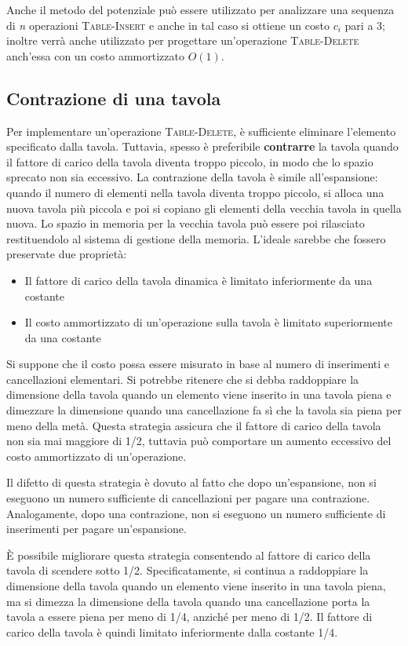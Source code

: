 \documentclass[10pt, a4paper]{report}
\begin{document}
Anche il metodo del potenziale può essere utilizzato per analizzare una sequenza di \textit{n} operazioni \textsc{Table-Insert} e anche in tal caso si ottiene un costo $c_i$ pari a 3; inoltre verrà anche utilizzato per progettare un'operazione \textsc{Table-Delete} anch'essa con un costo ammortizzato $O(1)$.
\subsection{Contrazione di una tavola}
Per implementare un'operazione \textsc{Table-Delete}, è sufficiente eliminare l'elemento specificato dalla tavola. Tuttavia, spesso è preferibile \textbf{contrarre} la tavola quando il fattore di carico della tavola diventa troppo piccolo, in modo che lo spazio sprecato non sia eccessivo. La contrazione della tavola è simile all'espansione: quando il numero di elementi nella tavola diventa troppo piccolo, si alloca una nuova tavola più piccola e poi si copiano gli elementi della vecchia tavola in quella nuova. Lo spazio in memoria per la vecchia tavola può essere poi rilasciato restituendolo al sistema di gestione della memoria. L'ideale sarebbe che fossero preservate due proprietà:
\begin{itemize}
\item Il fattore di carico della tavola dinamica è limitato inferiormente da una costante
\item Il costo ammortizzato di un'operazione sulla tavola è limitato superiormente da una costante
\end{itemize}
Si suppone che il costo possa essere misurato in base al numero di inserimenti e cancellazioni elementari. Si potrebbe ritenere che si debba raddoppiare la dimensione della tavola quando un elemento viene inserito in una tavola piena e dimezzare la dimensione quando una cancellazione fa sì che la tavola sia piena per meno della metà. Questa strategia assicura che il fattore di carico della tavola non sia mai maggiore di 1/2, tuttavia può comportare un aumento eccessivo del costo ammortizzato di un'operazione.

Il difetto di questa strategia è dovuto al fatto che dopo un'espansione, non si eseguono un numero sufficiente di cancellazioni per pagare una contrazione. Analogamente, dopo una contrazione, non si eseguono un numero sufficiente di inserimenti per pagare un'espansione.

È possibile migliorare questa strategia consentendo al fattore di carico della tavola di scendere sotto 1/2. Specificatamente, si continua a raddoppiare la dimensione della tavola quando un elemento viene inserito in una tavola piena, ma si dimezza la dimensione della tavola quando una cancellazione porta la tavola a essere piena per meno di 1/4, anziché per meno di 1/2. Il fattore di carico della tavola è quindi limitato inferiormente dalla costante 1/4.
\end{document}
